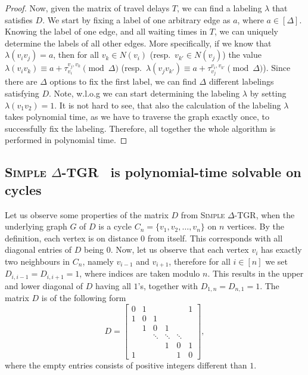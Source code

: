 \documentclass[11pt,a4paper]{article}
\theoremstyle{remark}
\theoremstyle{definition}
\newcommand{\deltaExact}{\textsc{Simple $\Delta$-TGR}}
\begin{document}
\begin{proof}
    Now, given the matrix of travel delays $T$, we can find a labeling $\lambda$ that satisfies $D$.
    We start by fixing a label of one arbitrary edge as $a$, where $a \in [\Delta]$.
    Knowing the label of one edge, and all waiting times in $T$, we can uniquely determine the labels of all other edges.
    More specifically, if we know that $\lambda(v_i v_j) = a$, then for all $v_k \in N(v_i)$ (resp.~$v_{k'} \in N(v_j)$)
    the value $\lambda(v_iv_k) \equiv a + \tau_{v_i}^{v_j,v_k} \pmod \Delta $ (resp.~$\lambda(v_j v_{k'}) \equiv a + \tau_{v_j}^{v_i,v_{k'}} \pmod \Delta $).
    Since there are $\Delta$ options to fix the first label, we can find $\Delta$ different labelings satisfying $D$.
    Note, w.l.o.g we can start determining the labeling $\lambda$ by setting $\lambda(v_1v_2) = 1$.
    It is not hard to see, that also the calculation of the labeling $\lambda$ takes polynomial time, as we have to traverse the graph exactly once, to successfully fix the labeling. Therefore, all together the whole algorithm is performed in polynomial time.
\end{proof}

\subsection{
\texorpdfstring{\deltaExact\ } {Simple Delta-TGR}
is polynomial-time solvable on cycles}

Let us observe some properties of the matrix $D$ from \deltaExact, when the underlying graph $G$ of $D$ is a cycle $C_n = \{v_1, v_2, \dots, v_n\}$  on $n$ vertices.
By the definition, each vertex is on distance $0$ from itself. This corresponds with all diagonal entries of $D$ being $0$.
Now, let us observe that each vertex $v_i$ has exactly two neighbours in $C_n$, namely $v_{i-1}$ and $v_{i+1}$,
therefore for all $i\in [n]$ we set $D_{i,i-1} = D_{i, i+1} = 1$, where indices are taken modulo $n$.
This results in the upper and lower diagonal of $D$ having all $1$'s, together with $D_{1,n} = D_{n,1} = 1$.
The matrix $D$ is of the following form
\begin{equation} \label{eq:D-matrixForCycles}
  D = 
  \begin{bmatrix}
    0 & 1 &  &  &  & 1\\
    1 & 0 & 1 &  &  & \\
    & 1 & 0 & 1 & & \\
    & & \ddots & \ddots & \ddots &   \\
    &   & &1 &  0 & 1\\ 
    1 &  &  &  &1 &  0 
  \end{bmatrix},
\end{equation}
where the empty entries consists of positive integers different than $1$.
\end{document}
